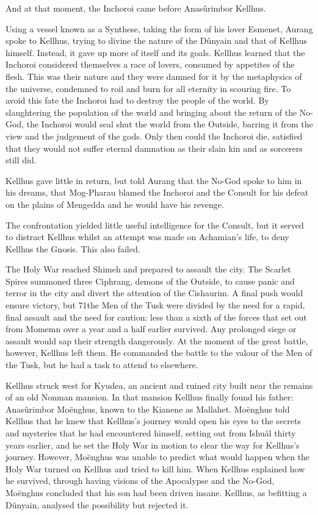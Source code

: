 \documentclass[]{book}
\begin{document}
And at that moment, the Inchoroi came before Anasûrimbor Kellhus.

Using a vessel known as a Synthese, taking the form of his lover Esmenet, Aurang
spoke to Kellhus, trying to divine the nature of the Dûnyain and that of Kellhus
himself. Instead, it gave up more of itself and its goals. Kellhus learned that the
Inchoroi considered themselves a race of lovers, consumed by appetites of the flesh.
This was their nature and they were damned for it by the metaphysics of the universe,
condemned to roil and burn for all eternity in scouring fire. To avoid this fate the
Inchoroi had to destroy the people of the world. By slaughtering the population of the
world and bringing about the return of the No-God, the Inchoroi would seal shut the
world from the Outside, barring it from the view and the judgement of the gods. Only
then could the Inchoroi die, satisfied that they would not suffer eternal damnation as
their slain kin and as sorcerers still did.

Kellhus gave little in return, but told Aurang that the No-God spoke to him in his
dreams, that Mog-Pharau blamed the Inchoroi and the Consult for his defeat on the
plains of Mengedda and he would have his revenge.

The confrontation yielded little useful intelligence for the Consult, but it served to
distract Kellhus whilst an attempt was made on Achamian's life, to deny Kellhus the
Gnosis. This also failed.

The Holy War reached Shimeh and prepared to assault the city. The Scarlet Spires
summoned three Ciphrang, demons of the Outside, to cause panic and terror in the
city and divert the attention of the Cishaurim. A final push would ensure victory, but
71the Men of the Tusk were divided by the need for a rapid, final assault and the need for
caution: less than a sixth of the forces that set out from Momemn over a year and a half
earlier survived. Any prolonged siege or assault would sap their strength dangerously.
At the moment of the great battle, however, Kellhus left them. He commanded the
battle to the valour of the Men of the Tusk, but he had a task to attend to elsewhere.

Kellhus struck west for Kyudea, an ancient and ruined city built near the remains of an
old Nonman mansion. In that mansion Kellhus finally found his father: Anasûrimbor
Moënghus, known to the Kianene as Mallahet. Moënghus told Kellhus that he knew
that Kellhus's journey would open his eyes to the secrets and mysteries that he had
encountered himself, setting out from Ishuäl thirty years earlier, and he set the Holy
War in motion to clear the way for Kellhus's journey. However, Moënghus was unable
to predict what would happen when the Holy War turned on Kellhus and tried to kill
him. When Kellhus explained how he survived, through having visions of the
Apocalypse and the No-God, Moënghus concluded that his son had been driven
insane. Kellhus, as befitting a Dûnyain, analysed the possibility but rejected it.
\end{document}
